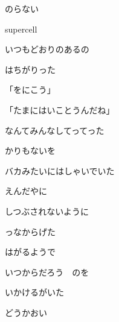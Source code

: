 \documentclass[a4paper,tate,twocolumn,12pt]{ltjtarticle}
\begin{document}
\thispagestyle{empty}

\begin{center}
{\LARGE {}のらない}

{\large supercell}
\end{center}

\vspace{1em}

\begin{flushleft}

\noindent\begin{minipage}{\linewidth}
いつもどおりのあるの

はちがりった

「をにこう」
\end{minipage}

\vspace{2em}

\noindent\begin{minipage}{\linewidth}
「たまにはいことうんだね」

なんてみんなしてってった

かりもないを

バカみたいにはしゃいでいた

えんだやに

しつぶされないように
\end{minipage}

\vspace{2em}

\noindent\begin{minipage}{\linewidth}
っなからげた

はがるようで
\end{minipage}

\vspace{2em}

\noindent\begin{minipage}{\linewidth}
いつからだろう　のを

いかけるがいた

どうかおい


\end{minipage}
\end{flushleft}
\end{document}
